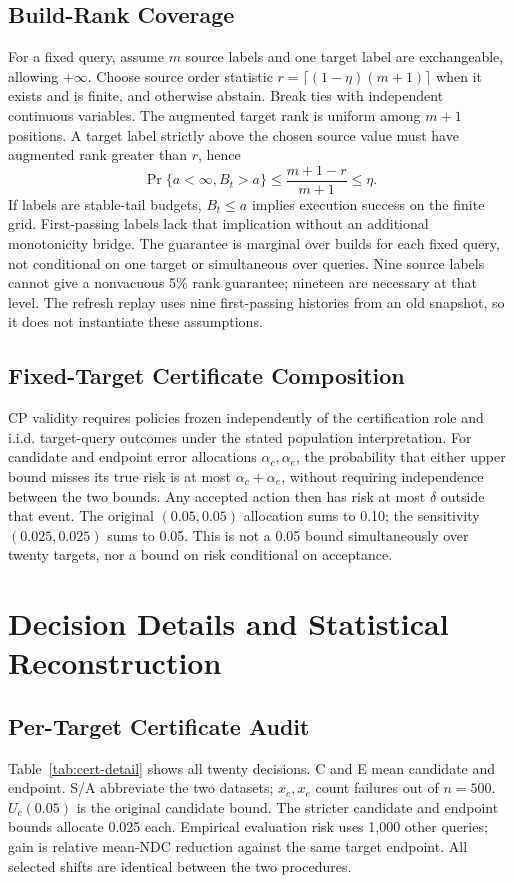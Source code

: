 \documentclass[sigconf,anonymous]{acmart}
\begin{document}
\subsection{Build-Rank Coverage}
For a fixed query, assume $m$ source labels and one target label are exchangeable, allowing $+\infty$. Choose source order statistic $r=\lceil(1-\eta)(m+1)\rceil$ when it exists and is finite, and otherwise abstain. Break ties with independent continuous variables. The augmented target rank is uniform among $m+1$ positions. A target label strictly above the chosen source value must have augmented rank greater than $r$, hence
\[
 \Pr\{a<\infty,B_t>a\}\le\frac{m+1-r}{m+1}\le\eta.
\]
If labels are stable-tail budgets, $B_t\le a$ implies execution success on the finite grid. First-passing labels lack that implication without an additional monotonicity bridge. The guarantee is marginal over builds for each fixed query, not conditional on one target or simultaneous over queries. Nine source labels cannot give a nonvacuous 5\% rank guarantee; nineteen are necessary at that level. The refresh replay uses nine first-passing histories from an old snapshot, so it does not instantiate these assumptions.

\subsection{Fixed-Target Certificate Composition}
CP validity requires policies frozen independently of the certification role and i.i.d. target-query outcomes under the stated population interpretation. For candidate and endpoint error allocations $\alpha_c,\alpha_e$, the probability that either upper bound misses its true risk is at most $\alpha_c+\alpha_e$, without requiring independence between the two bounds. Any accepted action then has risk at most $\delta$ outside that event. The original $(0.05,0.05)$ allocation sums to 0.10; the sensitivity $(0.025,0.025)$ sums to 0.05. This is not a 0.05 bound simultaneously over twenty targets, nor a bound on risk conditional on acceptance.

\section{Decision Details and Statistical Reconstruction}
\subsection{Per-Target Certificate Audit}
Table~\ref{tab:cert-detail} shows all twenty decisions. C and E mean candidate and endpoint. S/A abbreviate the two datasets; $x_c,x_e$ count failures out of $n=500$. $U_c(0.05)$ is the original candidate bound. The stricter candidate and endpoint bounds allocate 0.025 each. Empirical evaluation risk uses 1,000 other queries; gain is relative mean-NDC reduction against the same target endpoint. All selected shifts are identical between the two procedures.
\end{document}
